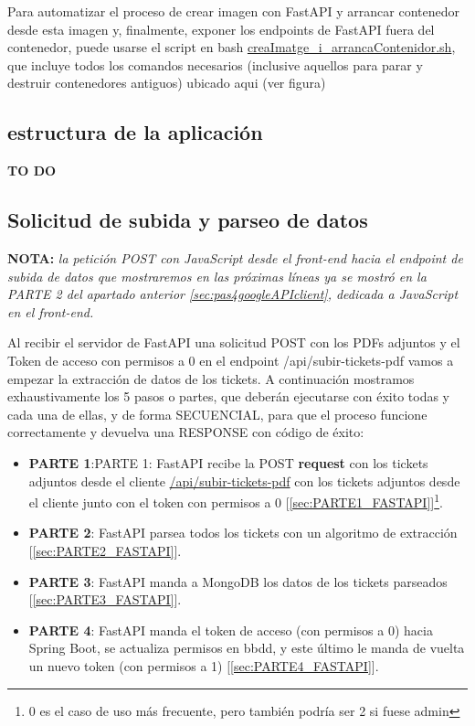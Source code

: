 \documentclass[a4paper,12pt]{report}
\begin{document}
	Para automatizar el proceso de crear imagen con FastAPI y arrancar contenedor desde esta imagen y, finalmente, exponer los endpoints de FastAPI fuera del contenedor, puede usarse el script en bash \href{https://github.com/blackcub3s/mercApp/blob/main/APP%20WEB/__FastAPI__/creaImatge_i_arrancaContenidor.sh}{creaImatge\_i\_arrancaContenidor.sh}, que incluye todos los comandos necesarios (inclusive aquellos para parar y destruir contenedores antiguos) ubicado aqui (ver figura)
	
	\subsection{estructura de la aplicación}
	
	\textbf{TO DO}
	
	\subsection{Solicitud de subida y parseo de datos}
	\label{sec:solicitudDeExtraccion}
	
	
	\textbf{NOTA:} \textit{la petición POST con JavaScript desde el front-end hacia el endpoint de subida de datos que mostraremos en las próximas líneas ya se mostró en la PARTE 2 del apartado anterior \ref{sec:pas4googleAPIclient}, dedicada a JavaScript en el front-end.}
	
	Al recibir el servidor de FastAPI una solicitud POST con los PDFs adjuntos y el Token de acceso con permisos a 0 en el endpoint /api/subir-tickets-pdf vamos a empezar la extracción de datos de los tickets. A continuación mostramos exhaustivamente los 5 pasos o partes, que deberán ejecutarse con éxito todas y cada una de ellas, y de forma SECUENCIAL, para que el proceso funcione correctamente y devuelva una RESPONSE con código de éxito:
	
	\begin{itemize}
	\setlength{\itemsep}{-.3em}
		\item \textbf{PARTE 1}:PARTE 1:  FastAPI recibe la POST \textbf{request} con los tickets adjuntos desde el cliente \href{https://github.com/blackcub3s/mercApp/blob/1394c4a58c59d41e1b64f1113007277676fe4cf8/APP%20WEB/__FastAPI__/app/controlador.py#L111-L128}{/api/subir-tickets-pdf} con los tickets adjuntos desde el cliente junto con el token con permisos a 0 [\ref{sec:PARTE1_FASTAPI}]\footnote{0 es el caso de uso más frecuente, pero también podría ser 2 si fuese admin}.
		\item \textbf{PARTE 2}: FastAPI parsea todos los tickets con un algoritmo de extracción [\ref{sec:PARTE2_FASTAPI}].
		\item \textbf{PARTE 3}: FastAPI manda a MongoDB los datos de los tickets parseados [\ref{sec:PARTE3_FASTAPI}].
		\item \textbf{PARTE 4}: FastAPI manda el token de acceso (con permisos a 0) hacia Spring Boot, se actualiza permisos en bbdd, y este último le manda de vuelta un nuevo token (con permisos a 1) [\ref{sec:PARTE4_FASTAPI}].
	\end{itemize}
\end{document}
